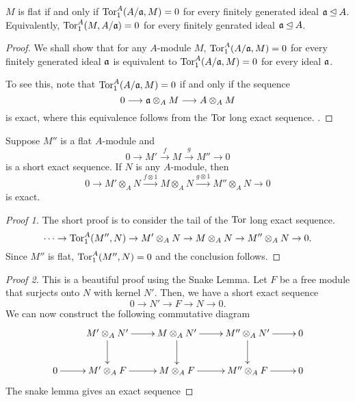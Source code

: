 \begin{lemma}
    $M$ is flat if and only if $\operatorname{Tor}^A_1(A/\mathfrak a, M) = 0$ for every finitely generated ideal $\mathfrak a\unlhd A$. Equivalently, $\operatorname{Tor}^A_1(M,A/\mathfrak a) = 0$ for every finitely genrated ideal $\mathfrak a\unlhd A$.
\end{lemma}
\begin{proof}
    We shall show that for any $A$-module $M$, $\operatorname{Tor}^A_1(A/\mathfrak a, M) = 0$ for every finitely generated ideal $\mathfrak a$ is equivalent to $\operatorname{Tor}^A_1(A/\mathfrak a, M) = 0$ for every ideal $\mathfrak a$.

    To see this, note that $\operatorname{Tor}^A_1(A/\mathfrak a, M) = 0$ if and only if the sequence 
    \begin{equation*}
        0\longrightarrow\mathfrak a\otimes_A M\longrightarrow A\otimes_A M
    \end{equation*}
    is exact, where this equivalence follows from the $\operatorname{Tor}$ long exact sequence. .
\end{proof}

\begin{proposition}
    Suppose $M''$ is a flat $A$-module and
    \begin{equation*}
        0\longrightarrow M'\stackrel{f}{\longrightarrow} M\stackrel{g}{\longrightarrow}M''\longrightarrow 0
    \end{equation*}
    is a short exact sequence. If $N$ is any $A$-module, then 
    \begin{equation*}
        0\longrightarrow M'\otimes_A N\stackrel{f\otimes 1}{\longrightarrow} M\otimes_A N\stackrel{g\otimes 1}{\longrightarrow} M''\otimes_A N\longrightarrow 0
    \end{equation*}
    is exact.
\end{proposition}
\begin{proof}[Proof 1]
    The short proof is to consider the tail of the $\operatorname{Tor}$ long exact sequence.
    \begin{equation*}
        \cdots\to\operatorname{Tor}^A_1(M'', N)\to M'\otimes_A N\to M\otimes_A N\to M''\otimes_A N\to 0.
    \end{equation*}
    Since $M''$ is flat, $\operatorname{Tor}^A_1(M'', N) = 0$ and the conclusion follows.
\end{proof}
\begin{proof}[Proof 2]
    This is a beautiful proof using the Snake Lemma. Let $F$ be a free module that surjects onto $N$ with kernel $N'$. Then, we have a short exact sequence 
    \begin{equation*}
        0\longrightarrow N'\longrightarrow F\longrightarrow N\longrightarrow 0.
    \end{equation*}
    We can now construct the following commutative diagram 
    \begin{equation*}
    \xymatrix {
        & M'\otimes_A N'\ar[r]\ar[d] & M\otimes_A N'\ar[r]\ar[d] & M''\otimes_A N'\ar[r]\ar[d] & 0\\
        0\ar[r] & M'\otimes_A F\ar[r] & M\otimes_A F\ar[r] & M''\otimes_A F\ar[r] & 0
    }
    \end{equation*}
    The snake lemma gives an exact sequence 
\end{proof}

